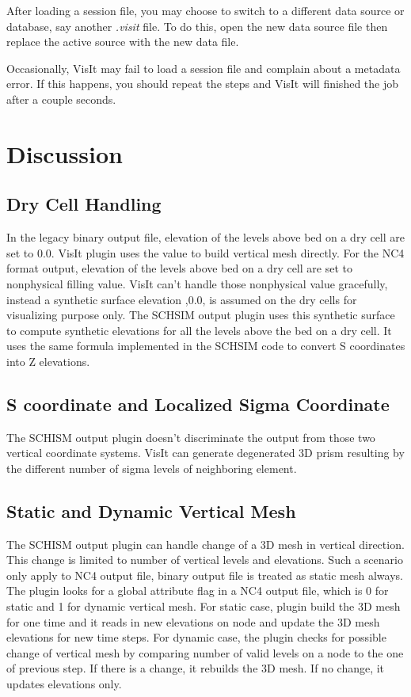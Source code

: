 \documentclass[12pt]{report}
\begin{document}
After loading a session file, you may choose to switch to a different data source or 
database, say another \emph{.visit} file.
To do this, open the new data source file then 
replace the active source with the new data file. 
					
				
Occasionally, VisIt may fail to load a session file and complain about a metadata error. 
If this happens, you should repeat the steps and VisIt will finished the job after a couple seconds.


\chapter{Discussion}

\section{Dry Cell Handling}

 In the legacy binary output file, elevation of the levels above bed on a dry cell are set to 0.0. VisIt plugin uses the
value to build vertical mesh directly. For the NC4 format output, elevation of the levels above bed on a dry cell are set to nonphysical filling value. VisIt can't handle those nonphysical value gracefully, instead a synthetic surface elevation ,0.0, is assumed on the dry cells for visualizing purpose only. The SCHSIM output plugin uses this synthetic surface to compute synthetic elevations for all the levels above the bed on a dry cell. It uses the same formula implemented in the SCHSIM code to convert S coordinates into Z elevations.

\section{S coordinate and Localized Sigma Coordinate}

 The SCHISM output plugin doesn't discriminate the output from those two vertical coordinate systems. VisIt can generate degenerated 3D prism
resulting by the different number of sigma levels of neighboring element.

\section{Static and Dynamic Vertical Mesh}

 The SCHISM output plugin can handle change of a 3D mesh in vertical direction. This change is limited to number of vertical levels and elevations. Such a scenario only apply to NC4 output file, binary output file is treated as static mesh always. The plugin looks for a global attribute flag in a NC4 output file, which is 0 for static and 1 for dynamic vertical mesh. For static case, plugin build the 3D mesh for one time and it reads in new elevations on node and update the 3D mesh elevations for new time steps. For dynamic case, the plugin checks for possible change of vertical mesh by comparing number of valid levels on a node to the one of previous step. If there is a change, it rebuilds the 3D mesh. If no change, it updates elevations only.
\end{document}
